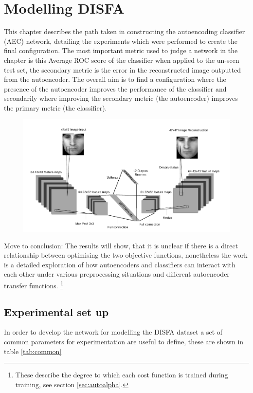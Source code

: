 \chapter{Modelling DISFA} \label{sec:model}
  This chapter describes the path taken in constructing the autoencoding classifier (AEC) network, detailing
  the experiments which were performed to create the final configuration.
  The most important metric used to judge a network in the chapter is this Average ROC score of the classifier
  when applied to the un-seen test set, the secondary metric is the error
  in the reconstructed image outputted from the autoencoder. The overall aim is to
  find a configuration where the presence of the autoencoder improves
  the performance of the classifier and secondarily where improving the secondary metric (the autoencoder) improves
  the primary metric (the classifier).

  \begin{figure}[h!]
   \centering
   \includegraphics[width=\textwidth]{illustrations/aec_network.pdf}
  \end{figure}

  {\color{red} Move to conclusion: The results will show, that it is unclear if there is a direct relationship between optimising the two objective functions, nonetheless
  the work is a detailed exploration of how autoencoders and classifiers can interact with each other
  under various preprocessing situations and different autoencoder transfer functions. \footnote{These describe the degree to which
  each cost function is trained during training, see section \ref{sec:autoalpha}.}}

  \section{Experimental set up}
    In order to develop the network for modelling the DISFA dataset a set of common
    parameters for experimentation are useful to define, these are shown in table \ref{tab:common}

